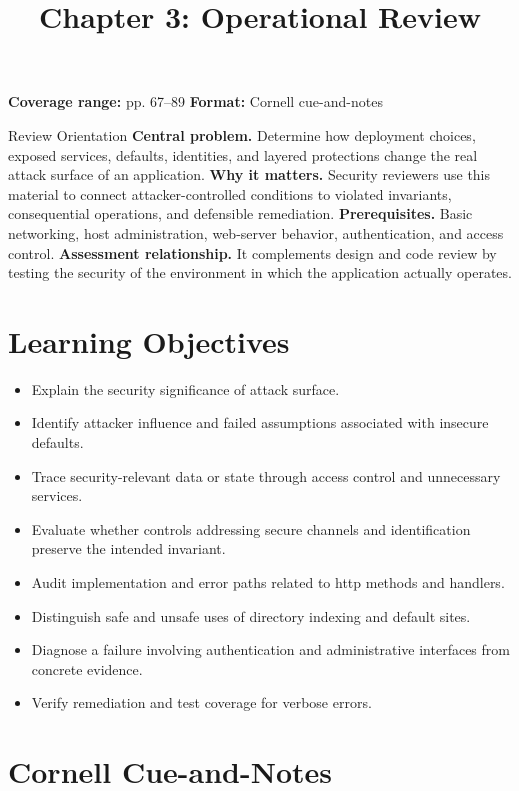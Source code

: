 \documentclass[11pt,letterpaper]{article}
\title{Chapter 3: Operational Review}
\author{}
\date{}
\begin{document}
\maketitle

\begin{center}
\small\color{Meta}\textbf{Coverage range:} pp. 67--89 \quad\textbullet\quad \textbf{Format:} Cornell cue-and-notes
\end{center}
\vspace{0.25em}
\begin{CornellOverviewBox}{Review Orientation}
\textbf{Central problem.} Determine how deployment choices, exposed services, defaults, identities, and layered protections change the real attack surface of an application.
\textbf{Why it matters.} Security reviewers use this material to connect attacker-controlled conditions to violated invariants, consequential operations, and defensible remediation.
\textbf{Prerequisites.} Basic networking, host administration, web-server behavior, authentication, and access control.
\textbf{Assessment relationship.} It complements design and code review by testing the security of the environment in which the application actually operates.
\end{CornellOverviewBox}
\section{Learning Objectives}
\begin{itemize}
\item Explain the security significance of attack surface.
\item Identify attacker influence and failed assumptions associated with insecure defaults.
\item Trace security-relevant data or state through access control and unnecessary services.
\item Evaluate whether controls addressing secure channels and identification preserve the intended invariant.
\item Audit implementation and error paths related to http methods and handlers.
\item Distinguish safe and unsafe uses of directory indexing and default sites.
\item Diagnose a failure involving authentication and administrative interfaces from concrete evidence.
\item Verify remediation and test coverage for verbose errors.
\end{itemize}
\section{Cornell Cue-and-Notes}
\end{document}
